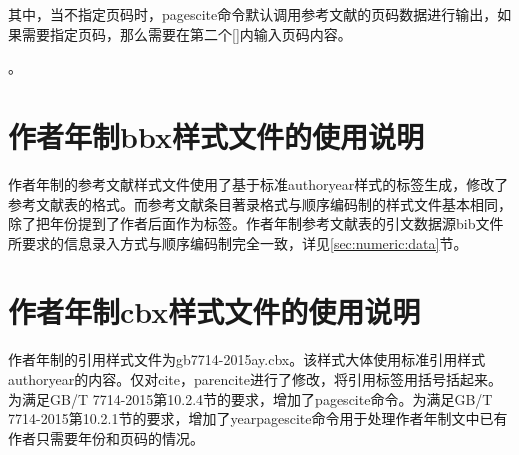 其中，当不指定页码时，pagescite命令默认调用参考文献的页码数据进行输出，如果需要指定页码，那么需要在第二个[]内输入页码内容。

。

\section{作者年制bbx样式文件的使用说明}

作者年制的参考文献样式文件使用了基于标准authoryear样式的标签生成，修改了参考文献表的格式。而参考文献条目著录格式与顺序编码制的样式文件基本相同，除了把年份提到了作者后面作为标签。作者年制参考文献表的引文数据源bib文件所要求的信息录入方式与顺序编码制完全一致，详见\ref{sec:numeric:data}节。





\section{作者年制cbx样式文件的使用说明}\label{sec:cbxay:usage}

作者年制的引用样式文件为gb7714-2015ay.cbx。该样式大体使用标准引用样式authoryear的内容。仅对cite，parencite进行了修改，将引用标签用括号括起来。为满足GB/T 7714-2015第10.2.4节的要求，增加了pagescite命令。为满足GB/T 7714-2015第10.2.1节的要求，增加了yearpagescite命令用于处理作者年制文中已有作者只需要年份和页码的情况。

